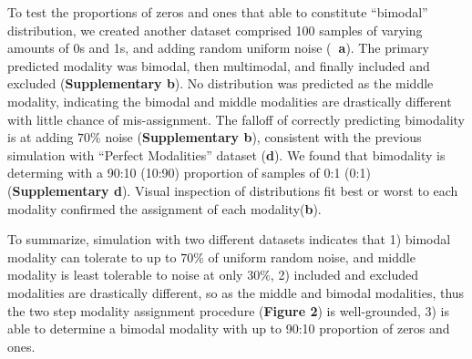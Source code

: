 To test the proportions of zeros and ones that able to constitute ``bimodal'' distribution, we created another dataset comprised 100 samples of varying amounts of 0s and 1s, and adding random uniform noise (\textbf{~a}). The primary predicted modality was bimodal, then multimodal, and finally included and excluded (\textbf{Supplementary b}). No distribution was predicted as the middle modality, indicating the bimodal and middle modalities are drastically different with little chance of mis-assignment. The falloff of correctly predicting bimodality is at adding $70\%$ noise (\textbf{Supplementary b}), consistent with the previous simulation with ``Perfect Modalities'' dataset (\textbf{d}). We found that bimodality is determing with a 90:10 (10:90) proportion of samples of 0:1 (0:1) (\textbf{Supplementary d}). Visual inspection of distributions fit best or worst to each modality confirmed the assignment of each modality(\textbf{b}).

To summarize, simulation with two different datasets indicates that 1) bimodal modality can tolerate to up to $70\%$ of uniform random noise, and middle modality is least tolerable to noise at only $30\%$, 2) included and excluded modalities are drastically different, so as the middle and bimodal modalities, thus the two step modality assignment procedure (\textbf{Figure 2}) is well-grounded, 3) \anchor is able to determine a bimodal modality with up to 90:10 proportion of zeros and ones.



